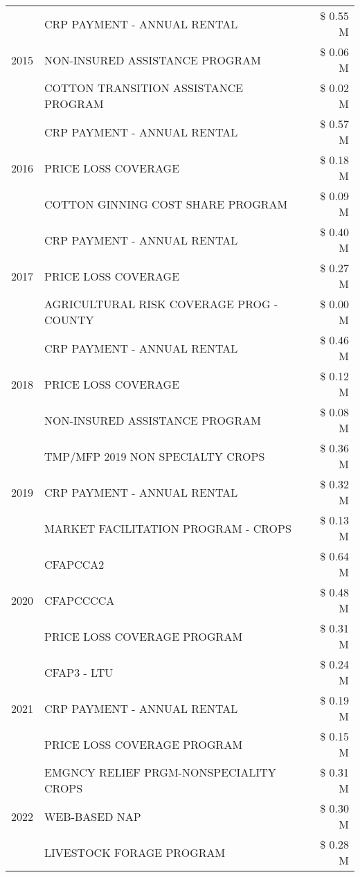 \begin{tabular}{llr}
\cline{1-3}
\multirow[t]{3}{*}{2015} & CRP PAYMENT - ANNUAL RENTAL & \$ 0.55 M \\
 & NON-INSURED ASSISTANCE PROGRAM & \$ 0.06 M \\
 & COTTON TRANSITION ASSISTANCE PROGRAM & \$ 0.02 M \\
\cline{1-3}
\multirow[t]{3}{*}{2016} & CRP PAYMENT - ANNUAL RENTAL & \$ 0.57 M \\
 & PRICE LOSS COVERAGE & \$ 0.18 M \\
 & COTTON GINNING COST SHARE PROGRAM & \$ 0.09 M \\
\cline{1-3}
\multirow[t]{3}{*}{2017} & CRP PAYMENT - ANNUAL RENTAL & \$ 0.40 M \\
 & PRICE LOSS COVERAGE & \$ 0.27 M \\
 & AGRICULTURAL RISK COVERAGE PROG - COUNTY & \$ 0.00 M \\
\cline{1-3}
\multirow[t]{3}{*}{2018} & CRP PAYMENT - ANNUAL RENTAL & \$ 0.46 M \\
 & PRICE LOSS COVERAGE & \$ 0.12 M \\
 & NON-INSURED ASSISTANCE PROGRAM & \$ 0.08 M \\
\cline{1-3}
\multirow[t]{3}{*}{2019} & TMP/MFP 2019 NON SPECIALTY CROPS & \$ 0.36 M \\
 & CRP PAYMENT - ANNUAL RENTAL & \$ 0.32 M \\
 & MARKET FACILITATION PROGRAM - CROPS & \$ 0.13 M \\
\cline{1-3}
\multirow[t]{3}{*}{2020} & CFAPCCA2 & \$ 0.64 M \\
 & CFAPCCCCA & \$ 0.48 M \\
 & PRICE LOSS COVERAGE PROGRAM & \$ 0.31 M \\
\cline{1-3}
\multirow[t]{3}{*}{2021} & CFAP3 - LTU & \$ 0.24 M \\
 & CRP PAYMENT - ANNUAL RENTAL & \$ 0.19 M \\
 & PRICE LOSS COVERAGE PROGRAM & \$ 0.15 M \\
\cline{1-3}
\multirow[t]{3}{*}{2022} & EMGNCY RELIEF PRGM-NONSPECIALITY CROPS & \$ 0.31 M \\
 & WEB-BASED NAP & \$ 0.30 M \\
 & LIVESTOCK FORAGE PROGRAM & \$ 0.28 M \\
\cline{1-3}
\bottomrule
\end{tabular}
